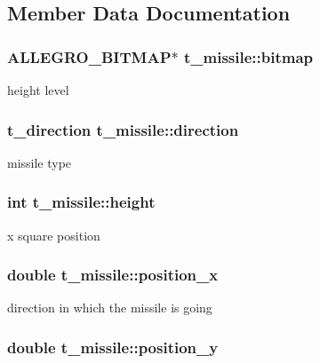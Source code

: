 \subsection{Member Data Documentation}
\hypertarget{structt__missile_ab9bf06a913015c3de3c23f1fe8870306}{
\subsubsection[{bitmap}]{\setlength{\rightskip}{0pt plus 5cm}A\-L\-L\-E\-G\-R\-O\-\_\-\-B\-I\-T\-M\-A\-P$\ast$ t\-\_\-missile\-::bitmap}}\label{structt__missile_ab9bf06a913015c3de3c23f1fe8870306}
height level \hypertarget{structt__missile_ae4dadc8f7d044549eee89b6a3269ea16}{
\subsubsection[{direction}]{\setlength{\rightskip}{0pt plus 5cm}t\-\_\-direction t\-\_\-missile\-::direction}}\label{structt__missile_ae4dadc8f7d044549eee89b6a3269ea16}
missile type \hypertarget{structt__missile_a6b80ab2e879a495fb9b9759a8764e995}{
\subsubsection[{height}]{\setlength{\rightskip}{0pt plus 5cm}int t\-\_\-missile\-::height}}\label{structt__missile_a6b80ab2e879a495fb9b9759a8764e995}
x square position \hypertarget{structt__missile_ad3b6c8669fcc124c1937dbe83055c59c}{
\subsubsection[{position\-\_\-x}]{\setlength{\rightskip}{0pt plus 5cm}double t\-\_\-missile\-::position\-\_\-x}}\label{structt__missile_ad3b6c8669fcc124c1937dbe83055c59c}
direction in which the missile is going \hypertarget{structt__missile_ab72534e808fc45603282f9728de6f9cc}{
\subsubsection[{position\-\_\-y}]{\setlength{\rightskip}{0pt plus 5cm}double t\-\_\-missile\-::position\-\_\-y}}\label{structt__missile_ab72534e808fc45603282f9728de6f9cc}
